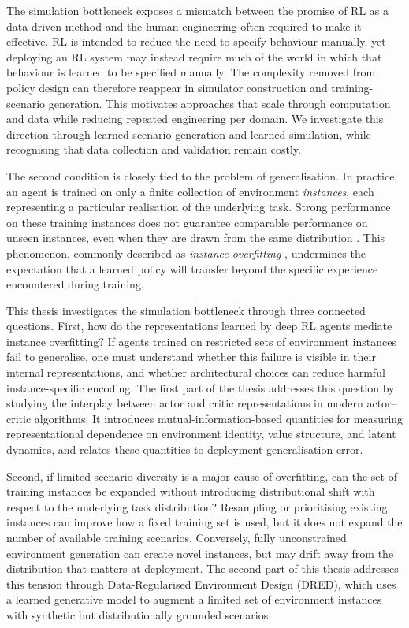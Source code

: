 The simulation bottleneck exposes a mismatch between the promise of RL as a data-driven method and the human engineering often required to make it effective. RL is intended to reduce the need to specify behaviour manually, yet deploying an RL system may instead require much of the world in which that behaviour is learned to be specified manually. The complexity removed from policy design can therefore reappear in simulator construction and training-scenario generation. This motivates approaches that scale through computation and data while reducing repeated engineering per domain. We investigate this direction through learned scenario generation and learned simulation, while recognising that data collection and validation remain costly.

The second condition is closely tied to the problem of generalisation. In practice, an agent is trained on only a finite collection of environment \textit{instances}, each representing a particular realisation of the underlying task. Strong performance on these training instances does not guarantee comparable performance on unseen instances, even when they are drawn from the same distribution \citep{procgen}. This phenomenon, commonly described as \emph{instance overfitting} \citep{instance_invariant}, undermines the expectation that a learned policy will transfer beyond the specific experience encountered during training.

This thesis investigates the simulation bottleneck through three connected questions. First, how do the representations learned by deep RL agents mediate instance overfitting? If agents trained on restricted sets of environment instances fail to generalise, one must understand whether this failure is visible in their internal representations, and whether architectural choices can reduce harmful instance-specific encoding. The first part of the thesis addresses this question by studying the interplay between actor and critic representations in modern actor--critic algorithms. It introduces mutual-information-based quantities for measuring representational dependence on environment identity, value structure, and latent dynamics, and relates these quantities to deployment generalisation error.

Second, if limited scenario diversity is a major cause of overfitting, can the set of training instances be expanded without introducing distributional shift with respect to the underlying task distribution? Resampling or prioritising existing instances can improve how a fixed training set is used, but it does not expand the number of available training scenarios. Conversely, fully unconstrained environment generation can create novel instances, but may drift away from the distribution that matters at deployment. The second part of this thesis addresses this tension through Data-Regularised Environment Design (\hbox{DRED}), which uses a learned generative model to augment a limited set of environment instances with synthetic but distributionally grounded scenarios.

